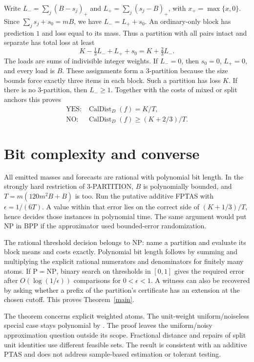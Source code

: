 \documentclass[11pt,a4paper]{amsart}
\newcommand{\caldist}{\operatorname{CalDist}}
\begin{document}
Write \(L_-=\sum_j(B-s_j)_+\) and
\(L_+=\sum_j(s_j-B)_+\), with \(x_+=\max\{x,0\}\).
Since \(\sum_js_j+s_0=mB\), we have \(L_-=L_++s_0\).
An ordinary-only block has prediction \(1\) and loss equal
to its mass. Thus a partition with all pairs intact and
separate has total loss at least
\[
 K-\tfrac13 L_-+L_++s_0=K+\tfrac23 L_-.
\]
The loads are sums of indivisible integer weights.
If \(L_-=0\), then \(s_0=0\), \(L_+=0\), and every load is
\(B\). These assignments form a 3-partition because the size
bounds force exactly three items in each block. Such a partition
has loss \(K\). If there is no 3-partition, then \(L_-\ge1\).
Together with the costs of mixed or split anchors this proves
\[
 \begin{array}{ll}
 \text{YES:}&\caldist_D(f)=K/T,\\[2pt]
 \text{NO:}&\caldist_D(f)\ge (K+2/3)/T.
 \end{array}
\]

\section{Bit complexity and converse}

All emitted masses and forecasts are rational with polynomial
bit length. In the strongly hard restriction of 3-PARTITION,
\(B\) is polynomially bounded, and \(T=m(120m^2B+B)\) is too.
Run the putative additive FPTAS with
\(\epsilon=1/(6T)\). A value within that error lies on the
correct side of \((K+1/3)/T\), hence decides those instances
in polynomial time. The same argument would put \(\mathrm{NP}\)
in \(\mathrm{BPP}\) if the approximator used bounded-error
randomization.

The rational threshold decision belongs to \(\mathrm{NP}\):
name a partition and evaluate its block means and costs exactly.
Polynomial bit length follows by summing and multiplying the
explicit rational numerators and denominators for finitely many
atoms. If \(\mathrm P=\mathrm{NP}\), binary search on
thresholds in \([0,1]\) gives the required error after
\(O(\log(1/\epsilon))\) comparisons for \(0<\epsilon<1\).
A witness can also be recovered by asking whether a prefix
of the partition's certificate has an extension at the chosen cutoff.
This proves Theorem~\ref{main}.

The theorem concerns explicit weighted atoms. The unit-weight
uniform/noiseless special case stays polynomial by \cite{qiao}.
The proof leaves the uniform/noisy approximation question outside its scope.
Fractional distance and repairs of split unit identities
\cite{qz,wy} use different feasible sets. The result is
consistent with an additive PTAS and does not address
sample-based estimation or tolerant testing.
\end{document}
